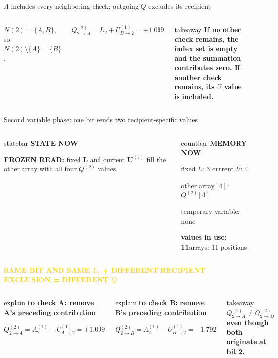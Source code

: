 \documentclass[aspectratio=169,9pt,t]{beamer}
\newcommand{\countstrip}[4]{%
  \begin{columns}[T,onlytextwidth]
    \column{.695\textwidth}
      \begin{beamercolorbox}[rounded=true,sep=.62ex]{statebar}
        \fontsize{6.4}{7.0}\selectfont\textcolor{Muted}{\bfseries STATE NOW}\par
        \vspace{.15ex}\scriptsize #1
      \end{beamercolorbox}
    \column{.285\textwidth}
      \begin{beamercolorbox}[rounded=true,sep=.52ex]{countbar}
        \fontsize{6.4}{7.0}\selectfont\textcolor{BP}{\bfseries MEMORY NOW}\par
        \fontsize{5.9}{6.6}\selectfont
        fixed $L$: 3 \quad current $U$: 4\par
        other array$[4]$: #2\par
        temporary variable: #3\par
        \textbf{values in use: #4}\quad arrays: 11 positions
      \end{beamercolorbox}
  \end{columns}\vspace{.6mm}}
\newcommand{\phase}[1]{%
  \centering\colorbox{GoldSoft}{\strut\scriptsize\bfseries\textcolor{Gold}{#1}}\par\vspace{1mm}}
\newcommand{\callout}[1]{%
  \begin{beamercolorbox}[rounded=true,sep=.65ex]{explain}
    \scriptsize #1
  \end{beamercolorbox}}
\newcommand{\bpgraphbase}{%
  \node[check] (A) at (-1.7,1.65) {$A$};
  \node[check] (B) at ( 1.7,1.65) {$B$};
  \node[bit] (b1) at (-3.0,0) {bit 1};
  \node[bit] (b2) at ( 0.0,0) {bit 2};
  \node[bit] (b3) at ( 3.0,0) {bit 3};
  \draw[edge] (A)--(b1);
  \draw[edge] (A)--(b2);
  \draw[edge] (B)--(b2);
  \draw[edge] (B)--(b3);
  \node[below=3.5mm of b1,font=\tiny] {$L_1=-2.197$};
  \node[below=3.5mm of b2,font=\tiny] {$L_2=+0.405$};
  \node[below=3.5mm of b3,font=\tiny] {$L_3=+0.693$};
}
\begin{document}
\begin{frame}{\texorpdfstring{$\Lambda$}{Lambda} includes every neighboring check; outgoing \texorpdfstring{$Q$}{Q} excludes its recipient}
\begin{columns}[T,onlytextwidth]
{        $N(2)=\{A,B\}$, so $N(2)\setminus\{A\}=\{B\}$.\par
        \centering$\displaystyle
          Q^{(2)}_{2\to A}=L_2+U^{(1)}_{B\to2}=+1.099$}
      \vspace{1mm}
      \begin{beamercolorbox}[rounded=true,sep=.8ex]{takeaway}
        \centering\scriptsize\bfseries
        If no other check remains, the index set is empty and the summation contributes zero. If another check remains, its $U$ value is included.
      \end{beamercolorbox}
  \end{columns}

\end{frame}

\begin{frame}{Second variable phase: one bit sends two recipient-specific values}
  \countstrip{\textbf{FROZEN READ: }fixed $\mathbf L$ and current $\mathbf U^{(1)}$ fill the other array with all four $Q^{(2)}$ values.}{$Q^{(2)}[4]$}{none}{11}

  \phase{SAME BIT AND SAME $L_2$ \quad + \quad DIFFERENT RECIPIENT EXCLUSION \quad = \quad DIFFERENT $Q$}

  \begin{columns}[T,onlytextwidth]
      \centering
      \callout{\centering\textbf{to check A: remove A's preceding contribution}\par
        \(
          Q^{(2)}_{2\to A}
            =\Lambda^{(1)}_2-U^{(1)}_{A\to2}
            =+1.099
        \)}
      \vspace{.4mm}
      \callout{\centering\textbf{to check B: remove B's preceding contribution}\par
        \(
          Q^{(2)}_{2\to B}
            =\Lambda^{(1)}_2-U^{(1)}_{B\to2}
            =-1.792
        \)}
      \vspace{.4mm}
      \begin{beamercolorbox}[rounded=true,sep=.65ex]{takeaway}
        \centering\scriptsize\bfseries
        $Q^{(2)}_{2\to A}\ne Q^{(2)}_{2\to B}$ even though both originate at bit 2.
      \end{beamercolorbox}
  \end{columns}


\end{frame}
\end{document}
